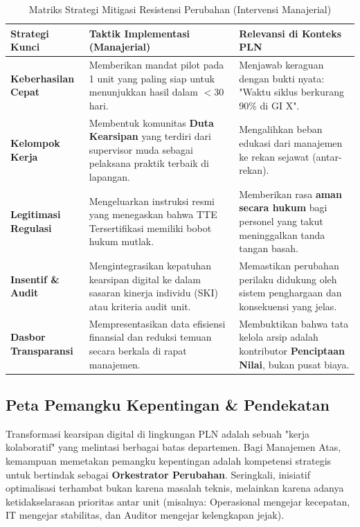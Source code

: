 \documentclass[12pt,a4paper]{report}
\begin{document}
\begin{table}[htbp]
\centering
\small
\caption{Matriks Strategi Mitigasi Resistensi Perubahan (Intervensi Manajerial)}
\begin{tabularx}{\textwidth}{@{} >{\raggedright\arraybackslash}l >{\raggedright\arraybackslash}X >{\raggedright\arraybackslash}X @{}}
\toprule
\textbf{Strategi Kunci} & \textbf{Taktik Implementasi (Manajerial)} & \textbf{Relevansi di Konteks PLN} \\
\midrule
\textbf{Keberhasilan Cepat} & Memberikan mandat pilot pada 1 unit yang paling siap untuk menunjukkan hasil dalam $<$30 hari. & Menjawab keraguan dengan bukti nyata: "Waktu siklus berkurang 90\% di GI X". \\
\textbf{Kelompok Kerja} & Membentuk komunitas \textbf{Duta Kearsipan} yang terdiri dari supervisor muda sebagai pelaksana praktik terbaik di lapangan. & Mengalihkan beban edukasi dari manajemen ke rekan sejawat (antar-rekan). \\
\textbf{Legitimasi Regulasi} & Mengeluarkan instruksi resmi yang menegaskan bahwa TTE Tersertifikasi memiliki bobot hukum mutlak. & Memberikan rasa \textbf{aman secara hukum} bagi personel yang takut meninggalkan tanda tangan basah. \\
\textbf{Insentif \& Audit} & Mengintegrasikan kepatuhan kearsipan digital ke dalam sasaran kinerja individu (SKI) atau kriteria audit unit. & Memastikan perubahan perilaku didukung oleh sistem penghargaan dan konsekuensi yang jelas. \\
\textbf{Dasbor Transparansi} & Mempresentasikan data efisiensi finansial dan reduksi temuan secara berkala di rapat manajemen. & Membuktikan bahwa tata kelola arsip adalah kontributor \textbf{Penciptaan Nilai}, bukan pusat biaya. \\
\bottomrule
\end{tabularx}
\end{table}

\subsection{Peta Pemangku Kepentingan \& Pendekatan}
Transformasi kearsipan digital di lingkungan PLN adalah sebuah "kerja kolaboratif" yang melintasi berbagai batas departemen. Bagi Manajemen Atas, kemampuan memetakan pemangku kepentingan adalah kompetensi strategis untuk bertindak sebagai \textbf{Orkestrator Perubahan}. Seringkali, inisiatif optimalisasi terhambat bukan karena masalah teknis, melainkan karena adanya ketidakselarasan prioritas antar unit (misalnya: Operasional mengejar kecepatan, IT mengejar stabilitas, dan Auditor mengejar kelengkapan jejak).
\end{document}
